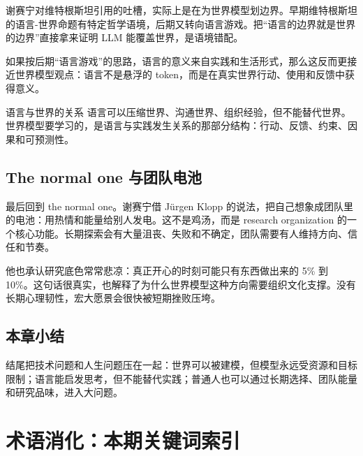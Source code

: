 \documentclass[a4paper]{article}
\begin{document}
谢赛宁对维特根斯坦引用的吐槽，实际上是在为世界模型划边界。早期维特根斯坦的语言-世界命题有特定哲学语境，后期又转向语言游戏。把“语言的边界就是世界的边界”直接拿来证明 LLM 能覆盖世界，是语境错配。

如果按后期“语言游戏”的思路，语言的意义来自实践和生活形式，那么这反而更接近世界模型观点：语言不是悬浮的 token，而是在真实世界行动、使用和反馈中获得意义。

\begin{importantbox}{语言与世界的关系}
语言可以压缩世界、沟通世界、组织经验，但不能替代世界。世界模型要学习的，是语言与实践发生关系的那部分结构：行动、反馈、约束、因果和可预测性。
\end{importantbox}

\subsection{The normal one 与团队电池}

最后回到 the normal one。谢赛宁借 Jürgen Klopp 的说法，把自己想象成团队里的电池：用热情和能量给别人发电。这不是鸡汤，而是 research organization 的一个核心功能。长期探索会有大量沮丧、失败和不确定，团队需要有人维持方向、信任和节奏。

他也承认研究底色常常悲凉：真正开心的时刻可能只有东西做出来的 5\% 到 10\%。这句话很真实，也解释了为什么世界模型这种方向需要组织文化支撑。没有长期心理韧性，宏大愿景会很快被短期挫败压垮。

\subsection{本章小结}

结尾把技术问题和人生问题压在一起：世界可以被建模，但模型永远受资源和目标限制；语言能启发思考，但不能替代实践；普通人也可以通过长期选择、团队能量和研究品味，进入大问题。

\section{术语消化：本期关键词索引}
\end{document}
